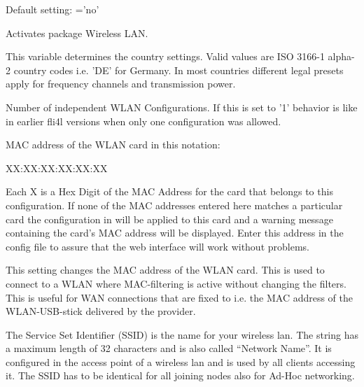 \begin{description}

        Default setting: ='no'

        Activates package Wireless LAN.


	This variable determines the country settings. Valid values are 
	ISO 3166-1 alpha-2 country codes i.e. 'DE' for Germany.
	In most countries different legal presets apply for frequency channels 
	and transmission power.


        Number of independent WLAN Configurations. If this is set to '1' 
        behavior is like in earlier fli4l versions when only one configuration 
        was allowed. 
        

         MAC address of the WLAN card in this notation:
         
         XX:XX:XX:XX:XX:XX

         Each X is a Hex Digit of the MAC Address for the card that belongs to 
         this configuration. If none of the MAC addresses entered here matches 
         a particular card the configuration in  will be applied 
         to this card and a warning message containing the card's MAC address will 
         be displayed. Enter this address in the config file to assure that the web 
         interface will work without problems.
  

         This setting changes the MAC address of the WLAN card. This is used to 
         connect to a WLAN where MAC-filtering is active without changing the filters.
         This is useful for WAN connections that are fixed to i.e. the MAC address 
         of the WLAN-USB-stick delivered by the provider.


        The Service Set Identifier (SSID) is the name for your wireless lan.
        The string has a maximum length of 32 characters and is also called 
        ``Network Name''. It is configured in the access point of a wireless 
        lan and is used by all clients accessing it. The SSID has to be identical 
        for all joining nodes also for Ad-Hoc networking.



\end{description}
